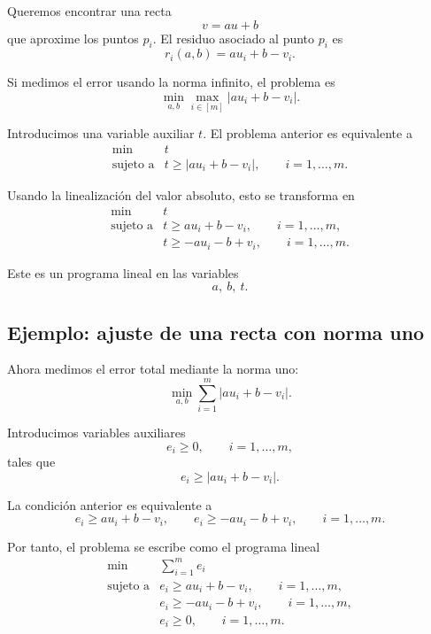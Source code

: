 Queremos encontrar una recta
\[
    v=au+b
\]
que aproxime los puntos \(p_i\). El residuo asociado al punto \(p_i\) es
\[
    r_i(a,b)=au_i+b-v_i.
\]

Si medimos el error usando la norma infinito, el problema es
\[
    \min_{a,b}
    \max_{i\in[m]}
    |au_i+b-v_i|.
\]

Introducimos una variable auxiliar \(t\). El problema anterior es equivalente a
\[
    \begin{array}{ll}
        \min & t\\[1mm]
        \text{sujeto a}
        & t\geq |au_i+b-v_i|,
        \qquad i=1,\dots,m.
    \end{array}
\]

Usando la linealización del valor absoluto, esto se transforma en
\[
    \begin{array}{ll}
        \min & t\\[1mm]
        \text{sujeto a}
        & t\geq au_i+b-v_i,
        \qquad i=1,\dots,m,\\
        & t\geq -au_i-b+v_i,
        \qquad i=1,\dots,m.
    \end{array}
\]

Este es un programa lineal en las variables
\[
    a,\ b,\ t.
\]

\subsection{Ejemplo: ajuste de una recta con norma uno}

Ahora medimos el error total mediante la norma uno:
\[
    \min_{a,b}
    \sum_{i=1}^{m}
    |au_i+b-v_i|.
\]

Introducimos variables auxiliares
\[
    e_i\geq 0,
    \qquad i=1,\dots,m,
\]
tales que
\[
    e_i\geq |au_i+b-v_i|.
\]

La condición anterior es equivalente a
\[
    e_i\geq au_i+b-v_i,
    \qquad
    e_i\geq -au_i-b+v_i,
    \qquad i=1,\dots,m.
\]

Por tanto, el problema se escribe como el programa lineal
\[
    \begin{array}{ll}
        \min & \displaystyle\sum_{i=1}^{m}e_i\\[2mm]
        \text{sujeto a}
        & e_i\geq au_i+b-v_i,
        \qquad i=1,\dots,m,\\
        & e_i\geq -au_i-b+v_i,
        \qquad i=1,\dots,m,\\
        & e_i\geq 0,
        \qquad i=1,\dots,m.
    \end{array}
\]

